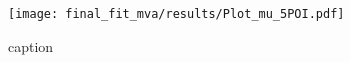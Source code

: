 \begin{figure}[hb]
	\centering
	\texttt{[image: final\_fit\_mva/results/Plot\_mu\_5POI.pdf]}
  \caption{caption}%
  \label{fig:5POI-mus}
\end{figure}